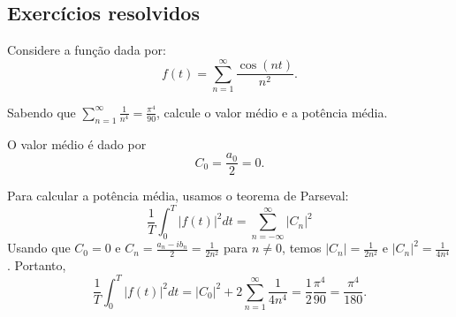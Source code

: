 \subsection*{Exercícios resolvidos}
\begin{exeresol}
    Considere a função dada por:
$$
f(t)=\sum_{n=1}^\infty \frac{\cos(nt)}{n^2}.
$$

Sabendo que $\sum_{n=1}^\infty \frac{1}{n^4}=\frac{\pi^4}{90}$, calcule o valor médio e a potência média.
\end{exeresol}
\begin{resol}
O valor médio é dado por
$$
C_0=\frac{a_0}{2}=0.
$$

Para calcular a potência média, usamos o teorema de Parseval:
$$
\frac{1}{T}\int_0^T|f(t)|^2dt=\sum_{n=-\infty}^\infty |C_n|^2
$$
Usando que $C_0=0$ e $C_n=\frac{a_n-ib_n}{2}=\frac{1}{2n^2}$ para $n\neq 0$, temos $|C_n|=\frac{1}{2n^2}$ e $|C_n|^2=\frac{1}{4n^4}$. Portanto,
$$
\frac{1}{T}\int_0^T|f(t)|^2dt=|C_0|^2+2\sum_{n=1}^\infty \frac{1}{4n^4}=\frac{1}{2}\frac{\pi^4}{90}=\frac{\pi^4}{180}.
$$
\end{resol}



